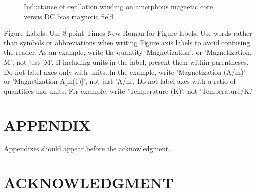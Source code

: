 \documentclass[letterpaper, 10 pt, conference]{ieeeconf}  %
\begin{document}
   \begin{figure}[thpb]
      \centering
      \caption{Inductance of oscillation winding on amorphous
       magnetic core versus DC bias magnetic field}
      \label{figurelabel}
   \end{figure}
   

Figure Labels: Use 8 point Times New Roman for Figure labels. Use words rather than symbols or abbreviations when writing Figure axis labels to avoid confusing the reader. As an example, write the quantity 'Magnetization', or 'Magnetization, M', not just 'M'. If including units in the label, present them within parentheses. Do not label axes only with units. In the example, write 'Magnetization (A/m)' or 'Magnetization {A[m(1)]}', not just 'A/m'. Do not label axes with a ratio of quantities and units. For example, write 'Temperature (K)', not 'Temperature/K.'

\addtolength{\textheight}{-12cm}   %







\section*{APPENDIX}

Appendixes should appear before the acknowledgment.

\section*{ACKNOWLEDGMENT}
\end{document}
